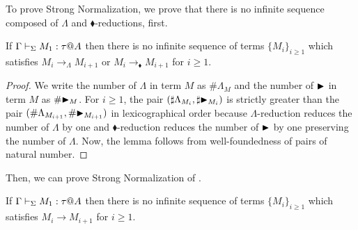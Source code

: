 To prove Strong Normalization, we prove that there is no infinite sequence composed of \( \Lambda \) and \( \blacklozenge \)-reductions, first.

\begin{lemma}
    \label{lemma:StrongNormalizationWithoutBetaReduction}
    If \( \G\V M_1:\tau@A \) then there is no infinite sequence of terms $\{M_i\}_{i\ge1}$ which satisfies $M_i \longrightarrow_\Lambda M_{i+1}$ or $M_i \longrightarrow_\blacklozenge M_{i+1}$ for $i\ge 1$.
\end{lemma}

\begin{proof}
    We write the number of \( \Lambda \) in term \( M \) as \( \#\Lambda_M \) and the number of \( {\mathop{\blacktriangleright}} \) in term \( M \) as \( \#{\mathop{\blacktriangleright}}_M \). For \( i \ge 1 \), the pair \( ( \sharp \Lambda_{M_i}, \sharp {\mathop{\blacktriangleright}}_{M_i} ) \) is strictly greater than the pair \( (\#\Lambda_{M_{i+1}}, \#{\mathop{\blacktriangleright}}_{M_{i+1}}) \) in lexicographical order because \( \Lambda \)-reduction reduces the number of \( \Lambda \) by one and \( \blacklozenge \)-reduction reduces the number of \( {\mathop{\blacktriangleright}} \) by one preserving the number of \( \Lambda \). Now, the lemma follows from well-foundedness of pairs of natural number.

\end{proof}

Then, we can prove Strong Normalization of \LMD.

\begin{theorem}
    \label{theorem:StrongNormalization}
    If \( \G\V M_1:\tau@A \) then there is no infinite sequence of terms $\{M_i\}_{i\ge1}$ which satisfies $M_i \longrightarrow M_{i+1}$ for $i\ge 1$.
\end{theorem}

